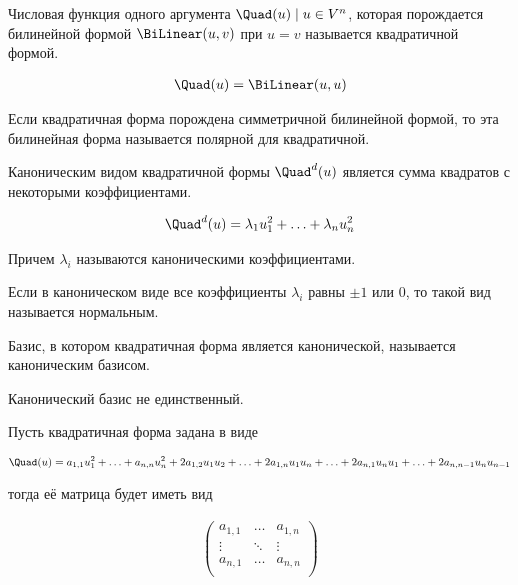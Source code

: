 
\begin{definition}
  Числовая функция одного аргумента \(\Quad(u) \mid u \in V^{n}\), которая
  порождается билинейной формой \(\BiLinear(u, v)\) при \(u = v\) называется
  квадратичной формой.

  \begin{align*}
    \Quad(u) = \BiLinear(u, u)
  \end{align*}
\end{definition}

\begin{remark}
  Если квадратичная форма порождена симметричной билинейной формой, то эта
  билинейная форма называется полярной для квадратичной.
\end{remark}

\begin{definition}
  Каноническим видом квадратичной формы \(\Quad^{d}(u)\) является сумма
  квадратов с некоторыми коэффициентами.

  \begin{align*}
    \Quad^{d}(u) = \lambda_{1} u_{1}^{2} + \dotsc + \lambda_{n} u_{n}^{2}
  \end{align*}

  Причем \(\lambda_{i}\) называются каноническими коэффициентами.
\end{definition}

\begin{definition}
  Если в каноническом виде все коэффициенты \(\lambda_{i}\) равны \(\pm 1\) или
  \(0\), то такой вид называется нормальным.
\end{definition}

\begin{definition}
  Базис, в котором квадратичная форма является канонической, называется
  каноническим базисом.
\end{definition}

\begin{remark}
  Канонический базис не единственный.
\end{remark}

\begin{remark}
  Пусть квадратичная форма задана в виде

  \begin{align*}
    \Quad(u)
    = a_{1,1} u_{1}^2 + \dotsc + a_{n,n} u_{n}^2
    + 2 a_{1,2} u_{1} u_{2} + \dotsc + 2 a_{1,n} u_{1} u_{n}
    + \dotsc
    + 2 a_{n,1} u_{n} u_{1} + \dotsc + 2 a_{n,n - 1} u_{n} u_{n - 1}
  \end{align*}

  тогда её матрица будет иметь вид

  \begin{align*}
    \begin{pmatrix}
      a_{1,1} & \dots  & a_{1,n} \\
      \vdots  & \ddots & \vdots \\
      a_{n,1} & \dots  & a_{n,n} \\
    \end{pmatrix}
  \end{align*}
\end{remark}

